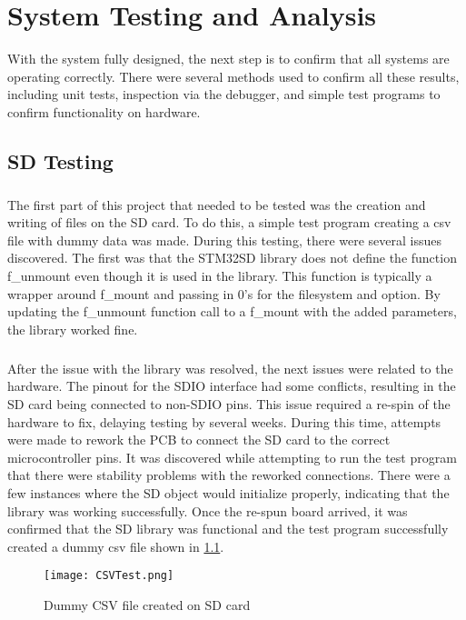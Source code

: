 \chapter{System Testing and Analysis}
With the system fully designed, the next step is to confirm that all systems are operating correctly.
There were several methods used to confirm all these results, including unit tests, inspection via the debugger, and simple test programs to confirm functionality on hardware.

\section{SD Testing}

\paragraph{}
The first part of this project that needed to be tested was the creation and writing of files on the SD card.
To do this, a simple test program creating a csv file with dummy data was made.
During this testing, there were several issues discovered.
The first was that the STM32SD library does not define the function f\_unmount even though it is used in the library.
This function is typically a wrapper around f\_mount and passing in 0's for the filesystem and option.
By updating the f\_unmount function call to a f\_mount with the added parameters, the library worked fine.

\paragraph{}
After the issue with the library was resolved, the next issues were related to the hardware.
The pinout for the SDIO interface had some conflicts, resulting in the SD card being connected to non-SDIO pins.
This issue required a re-spin of the hardware to fix, delaying testing by several weeks.
During this time, attempts were made to rework the PCB to connect the SD card to the correct microcontroller pins.
It was discovered while attempting to run the test program that there were stability problems with the reworked connections.
There were a few instances where the SD object would initialize properly, indicating that the library was working successfully.
Once the re-spun board arrived, it was confirmed that the SD library was functional and the test program successfully created a dummy csv file shown in \cref{fig:CSVTest}.

\begin{figure}[H]
	\centering
	\texttt{[image: CSVTest.png]}
	\caption{Dummy CSV file created on SD card}
	\label{fig:CSVTest}
\end{figure}

